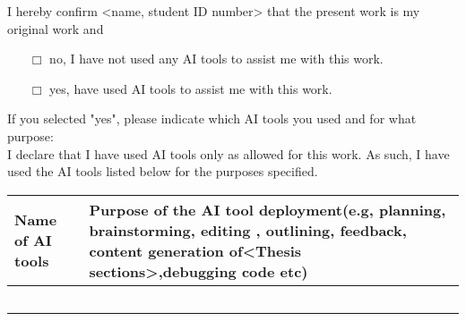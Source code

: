 

\begin{center}
\vspace*{2cm}
{\Huge {}}
\vspace{1.5cm}
\end{center}
\label{sec: GenAI Declaration Template}

\noindent I hereby confirm <name, student ID number> that the present work is my original work and  
\begin{itemize}
    \item[$\Box$]no, I have not used any AI tools to assist me with this work.
     \item[$\Box$] yes, have used AI tools to assist me with this work.
\end{itemize}
\noindent If you selected "yes", please indicate which AI tools you used and for what purpose:\\

I declare that I have used AI tools only as allowed for this work. As such, I have used the AI tools listed below for the purposes specified.

\begin{table}[h]
\centering
\begin{tabular}{|p{}|p{}|}
\hline
\textbf{Name of AI tools} & \textbf{Purpose of the AI tool deployment(e.g, planning, brainstorming, editing , outlining, feedback, content generation of<Thesis sections>,debugging code etc)} \\
\hline
 &  \\
\hline
 &  \\
\hline
 &  \\
\hline
 &  \\
\hline
 &  \\
\hline
\end{tabular}
\end{table}
